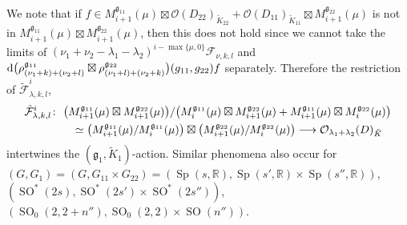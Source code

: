 \documentclass[pdftex]{sigma}
\numberwithin{equation}{section}
\newcommand{\BR}{\mathbb{R}}
\newcommand{\fg}{\mathfrak{g}}
\newcommand{\cF}{\mathcal{F}}
\newcommand{\cO}{\mathcal{O}}
\begin{document}
We note that if $f\in M_{i+1}^{\fg_{11}}(\mu)\boxtimes \cO(D_{22})_{\tilde{K}_{22}}+\cO(D_{11})_{\tilde{K}_{11}}\boxtimes M_{i+1}^{\fg_{22}}(\mu)$ is not in $M_{i+1}^{\fg_{11}}(\mu)\boxtimes M_{i+1}^{\fg_{22}}(\mu)$, then this does not hold since we cannot take the limits of $(\nu_1+\nu_2-\lambda_1-\lambda_2)^{i-\max\{\mu,0\}}\cF_{\nu,k,l}$ and ${\rm d}\big(\rho_{(\nu_1+k)+(\nu_2+l)}^{\fg_{11}}\boxtimes \rho_{(\nu_1+l)+(\nu_2+k)}^{\fg_{22}}\big)(g_{11},g_{22})f$ separately. Therefore the restriction of $\tilde{\cF}_{\lambda,k,l}^i$,
\begin{gather*}
\tilde{\cF}^i_{\lambda,k,l}\colon \ \big(M_{i+1}^{\fg_{11}}(\mu)\boxtimes M_{i+1}^{\fg_{22}}(\mu)\big)
/\big(M_i^{\fg_{11}}(\mu)\boxtimes M_{i+1}^{\fg_{22}}(\mu)+M_{i+1}^{\fg_{11}}(\mu)\boxtimes M_i^{\fg_{22}}(\mu)\big) \\
\hphantom{\tilde{\cF}^i_{\lambda,k,l}\colon}{} \ \simeq \big(M_{i+1}^{\fg_{11}}(\mu)/M_i^{\fg_{11}}(\mu)\big)\boxtimes\big(M_{i+1}^{\fg_{22}}(\mu)/M_i^{\fg_{22}}(\mu)\big)
\longrightarrow \cO_{\lambda_1+\lambda_2}(D)_{\tilde{K}}
\end{gather*}
intertwines the $(\fg_1,\tilde{K}_1)$-action. Similar phenomena also occur for $(G,G_1)=(G,G_{11}\times G_{22}) =(\operatorname{Sp}(s,\BR),\operatorname{Sp}(s',\BR)\times \operatorname{Sp}(s'',\BR))$, $(\operatorname{SO}^*(2s),\operatorname{SO}^*(2s')\times \operatorname{SO}^*(2s''))$, $(\operatorname{SO}_0(2,2+n''),\operatorname{SO}_0(2,2)\times \operatorname{SO}(n''))$.
\end{document}
